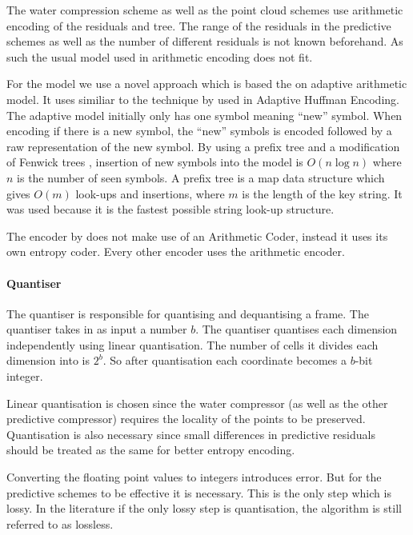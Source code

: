 \documentclass[a4paper]{report}
\begin{document}
The water compression scheme as well as the point cloud schemes use arithmetic
encoding of the residuals and tree. The range of the residuals in the
predictive schemes as well as the number of different residuals is not known
beforehand. As such the usual model used in arithmetic encoding does not
fit.

For the model we use a novel approach which is based the on adaptive
arithmetic model. It uses similiar to the technique by
\citet{cormack1984algorithms} used in Adaptive Huffman Encoding. The adaptive
model initially only has one symbol meaning ``new'' symbol. When encoding if
there is a new symbol, the ``new'' symbols is encoded followed by a raw
representation of the new symbol. By using a prefix tree and a modification of
Fenwick trees \citep{fenwick1994new}, insertion of new symbols into the model
is $O(n \log n)$ where $n$ is the number of seen symbols. A prefix tree is a
map data structure which gives $O(m)$ look-ups and insertions, where $m$ is
the length of the key string. It was used because it is the fastest possible
string look-up structure.

The encoder by \citet{omeltchenko2000sls} does not make use of an Arithmetic
Coder, instead it uses its own entropy coder. Every other encoder uses the
arithmetic encoder.


\paragraph{Quantiser}

The quantiser is responsible for quantising and dequantising a frame. The
quantiser takes in as input a number $b$. The quantiser quantises each
dimension independently using linear quantisation. The number of cells it
divides each dimension into is $2^b$. So after quantisation each coordinate
becomes a $b$-bit integer.

Linear quantisation is chosen since the water compressor (as well as the other
predictive compressor) requires the locality of the points to be
preserved. Quantisation is also necessary since small differences in
predictive residuals should be treated as the same for better entropy
encoding.

Converting the floating point values to integers introduces error. But for the
predictive schemes to be effective it is necessary. This is the only step
which is lossy. In the literature if the only lossy step is quantisation, the
algorithm is still referred to as lossless.
\end{document}
